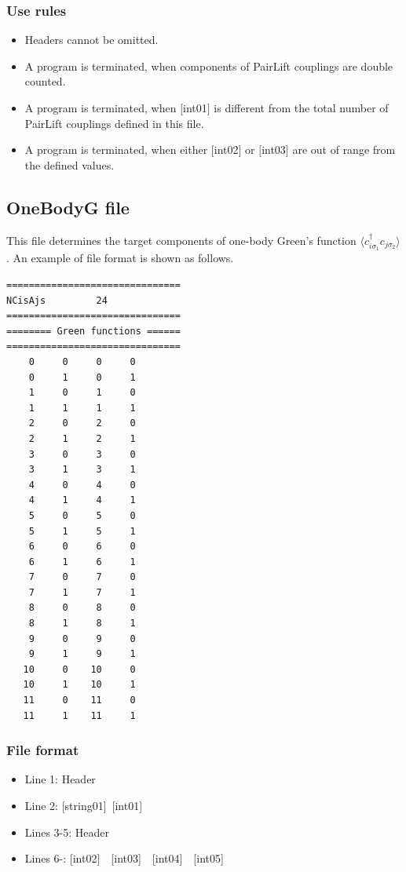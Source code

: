 \subsubsection{Use rules}
\begin{itemize}
\item Headers cannot be omitted. 
\item A program is terminated, when components of PairLift couplings are double counted.
\item A program is terminated, when $[$int01$]$ is different from the total number of PairLift couplings defined in this file.
\item A program is terminated, when either $[$int02$]$ or $[$int03$]$ are out of range from the defined values.
\end{itemize}

\newpage
\subsection{OneBodyG file}
\label{Subsec:onebodyg}
This file determines the target components of one-body Green's function $\langle c_{i\sigma_1}^{\dagger}c_{j\sigma_2}\rangle$. An example of file format is shown as follows.

\begin{minipage}{12.5cm}
\begin{screen}
\begin{verbatim}
===============================
NCisAjs         24
===============================
======== Green functions ======
===============================
    0     0     0     0
    0     1     0     1
    1     0     1     0
    1     1     1     1
    2     0     2     0
    2     1     2     1
    3     0     3     0
    3     1     3     1
    4     0     4     0
    4     1     4     1
    5     0     5     0
    5     1     5     1
    6     0     6     0
    6     1     6     1
    7     0     7     0
    7     1     7     1
    8     0     8     0
    8     1     8     1
    9     0     9     0
    9     1     9     1
   10     0    10     0
   10     1    10     1
   11     0    11     0
   11     1    11     1
\end{verbatim}
\end{screen}
\end{minipage}

\subsubsection{File format}
 \begin{itemize}
   \item  Line 1:  Header
   \item  Line 2:   [string01]~[int01]
   \item  Lines 3-5:  Header
   \item  Lines 6-: 
  [int02]~~[int03]~~[int04]~~[int05]
  \end{itemize}
